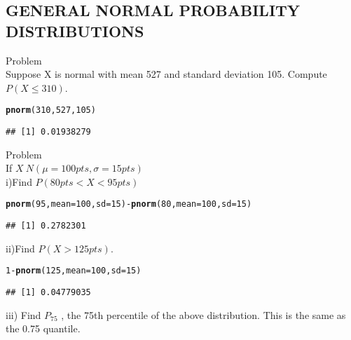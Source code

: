 \documentclass{article}\usepackage[]{graphicx}\usepackage[]{xcolor}
\makeatletter
\newcommand{\hlnum}[1]{\textcolor[rgb]{0.686,0.059,0.569}{#1}}%
\newcommand{\hlopt}[1]{\textcolor[rgb]{0,0,0}{#1}}%
\newcommand{\hldef}[1]{\textcolor[rgb]{0.345,0.345,0.345}{#1}}%
\newcommand{\hlkwc}[1]{\textcolor[rgb]{0.333,0.667,0.333}{#1}}%
\newcommand{\hlkwd}[1]{\textcolor[rgb]{0.737,0.353,0.396}{\textbf{#1}}}%
\newenvironment{kframe}{%
 \def\at@end@of@kframe{}%
 \ifinner\ifhmode%
  \def\at@end@of@kframe{\end{minipage}}%
  \begin{minipage}{\columnwidth}%
 \fi\fi%
 \def\FrameCommand##1{\hskip\@totalleftmargin \hskip-\fboxsep
 \colorbox{shadecolor}{##1}\hskip-\fboxsep
     \hskip-\linewidth \hskip-\@totalleftmargin \hskip\columnwidth}%
 \MakeFramed {\advance\hsize-\width
   \@totalleftmargin\z@ \linewidth\hsize
   \@setminipage}}%
 {\par\unskip\endMakeFramed%
 \at@end@of@kframe}
\newenvironment{knitrout}{}{} %
\makeatother
\begin{document}
\subsection{GENERAL NORMAL PROBABILITY DISTRIBUTIONS}
Problem\\
Suppose X is normal with mean 527 and standard deviation 105.
Compute $P(X \leq 310)$.
\begin{knitrout}
\color{fgcolor}\begin{kframe}
\begin{alltt}
\hlkwd{pnorm}\hldef{(}\hlnum{310}\hldef{,}\hlnum{527}\hldef{,}\hlnum{105}\hldef{)}
\end{alltt}
\begin{verbatim}
## [1] 0.01938279
\end{verbatim}
\end{kframe}
\end{knitrout}
Problem\\
If $X~N(\mu=100 pts,\sigma=15pts) $\\
i)Find $P(80 pts<X <95 pts)$
\begin{knitrout}
\color{fgcolor}\begin{kframe}
\begin{alltt}
\hlkwd{pnorm}\hldef{(}\hlnum{95}\hldef{,} \hlkwc{mean}\hldef{=}\hlnum{100}\hldef{,} \hlkwc{sd}\hldef{=}\hlnum{15}\hldef{)} \hlopt{-} \hlkwd{pnorm}\hldef{(}\hlnum{80}\hldef{,} \hlkwc{mean}\hldef{=}\hlnum{100}\hldef{,} \hlkwc{sd}\hldef{=}\hlnum{15}\hldef{)}
\end{alltt}
\begin{verbatim}
## [1] 0.2782301
\end{verbatim}
\end{kframe}
\end{knitrout}
ii)Find $P(X >125 pts)$.
\begin{knitrout}
\color{fgcolor}\begin{kframe}
\begin{alltt}
\hlnum{1} \hlopt{-} \hlkwd{pnorm}\hldef{(}\hlnum{125}\hldef{,} \hlkwc{mean}\hldef{=}\hlnum{100}\hldef{,} \hlkwc{sd}\hldef{=}\hlnum{15}\hldef{)}
\end{alltt}
\begin{verbatim}
## [1] 0.04779035
\end{verbatim}
\end{kframe}
\end{knitrout}
iii) Find $P_{75}$ , the 75th percentile of the above distribution. This is the same as the 0.75 quantile.\\
\end{document}
